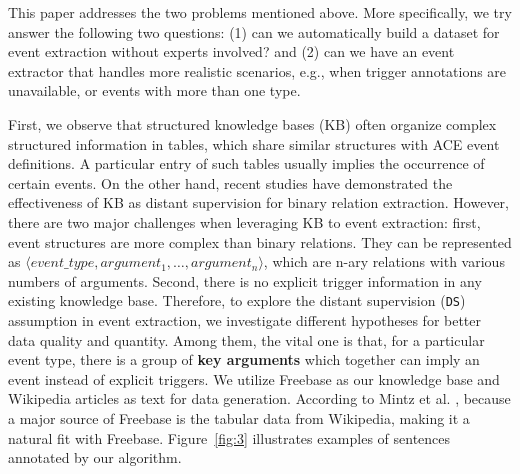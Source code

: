This paper addresses the two problems mentioned above. More specifically, we try answer the following two questions:
(1) can we automatically build a dataset for event extraction without experts involved?
and (2) can we have an event extractor that handles more realistic scenarios, e.g.,  when trigger annotations are unavailable, or events with more than one type.



First, we observe that structured knowledge bases (KB) often organize complex structured information in tables, which
share similar structures with ACE event definitions. A particular entry of such tables usually implies the occurrence
of certain events. On the other hand, recent studies \cite{mintz2009distant,zeng2015distant} have demonstrated the
effectiveness of KB as distant supervision for binary relation extraction. However, there are two major challenges when
leveraging KB to event extraction: first, event structures are more complex than binary relations. They can be
represented as $\langle event\_type, argument_1, \ldots, argument_n\rangle$, which are n-ary relations with various
numbers of arguments. Second, there is no explicit trigger information in any existing knowledge base. Therefore, to
explore the distant supervision (\texttt{DS}) assumption in event extraction, we investigate different hypotheses for
better data quality and quantity. Among them, the vital one is that, for a particular event type, there is a group of
\textbf{key arguments} which together can imply an event instead of explicit triggers. We utilize Freebase as our
knowledge base and Wikipedia articles as text for data generation. According to Mintz et al.
, because a major source of Freebase is the tabular data from Wikipedia, making it a
natural fit with Freebase. Figure~\ref{fig:3} illustrates examples of sentences annotated by our algorithm.


